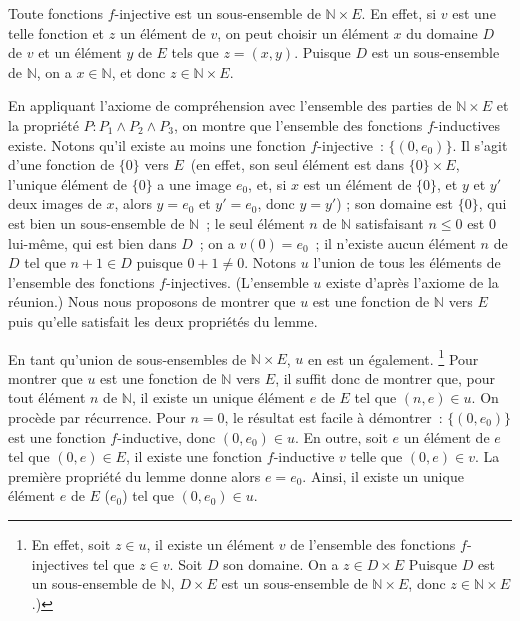 Toute fonctions $f$-injective est un sous-ensemble de $\mathbb{N} \times E$. 
En effet, si $v$ est une telle fonction et $z$ un élément de $v$, on peut choisir un élément $x$ du domaine $D$ de $v$ et un élément $y$ de $E$ tels que $z = (x,y)$.
Puisque $D$ est un sous-ensemble de $\mathbb{N}$, on a $x \in \mathbb{N}$, et donc $z \in \mathbb{N} \times E$.

En appliquant l'axiome de compréhension avec l'ensemble des parties de $\mathbb{N} \times E$ et la propriété $P: P_1 \wedge P_2 \wedge P_3$, on montre que l'ensemble des fonctions $f$-inductives existe. 
Notons qu'il existe au moins une fonction $f$-injective : $\lbrace (0, e_0) \rbrace$. 
Il s'agit d'une fonction de $\lbrace 0 \rbrace$ vers $E$ (en effet, son seul élément est dans $\lbrace 0 \rbrace \times E$, l'unique élément de $\lbrace 0 \rbrace$ a une image $e_0$, et, si $x$ est un élément de $\lbrace 0 \rbrace$, et $y$ et $y'$ deux images de $x$, alors $y = e_0$ et $y' = e_0$, donc $y = y'$) ; son domaine est $\lbrace 0 \rbrace$, qui est bien un sous-ensemble de $\mathbb{N}$ ; le seul élément $n$ de $\mathbb{N}$ satisfaisant $n \leq 0$ est $0$ lui-même, qui est bien dans $D$ ; on a $v(0) = e_0$ ; il n'existe aucun élément $n$ de $D$ tel que $n+1 \in D$ puisque $0+1 \neq 0$. 
Notons $u$ l'union de tous les éléments de l'ensemble des fonctions $f$-injectives. 
(L'ensemble $u$ existe d'après l'axiome de la réunion.) 
Nous nous proposons de montrer que $u$ est une fonction de $\mathbb{N}$ vers $E$ puis qu'elle satisfait les deux propriétés du lemme. 

En tant qu'union de sous-ensembles de $\mathbb{N} \times E$, $u$ en est un également.%
\footnote{
    En effet, soit $z \in u$, il existe un élément $v$ de l'ensemble des fonctions $f$-injectives tel que $z \in v$. 
    Soit $D$ son domaine. 
    On a $z \in D \times E$
    Puisque $D$ est un sous-ensemble de $\mathbb{N}$, $D \times E$ est un sous-ensemble de $\mathbb{N} \times E$, donc $z \in \mathbb{N} \times E$.)
}
Pour montrer que $u$ est une fonction de $\mathbb{N}$ vers $E$, il suffit donc de montrer que, pour tout élément $n$ de $\mathbb{N}$, il existe un unique élément $e$ de $E$ tel que $(n,e) \in u$. 
On procède par récurrence. 
Pour $n = 0$, le résultat est facile à démontrer : $\lbrace (0, e_0) \rbrace$ est une fonction $f$-inductive, donc $(0, e_0) \in u$. 
En outre, soit $e$ un élément de $e$ tel que $(0,e) \in E$, il existe une fonction $f$-inductive $v$ telle que $(0,e) \in v$. 
La première propriété du lemme donne alors $e = e_0$. 
Ainsi, il existe un unique élément $e$ de $E$ ($e_0$) tel que $(0, e_0) \in u$. 

